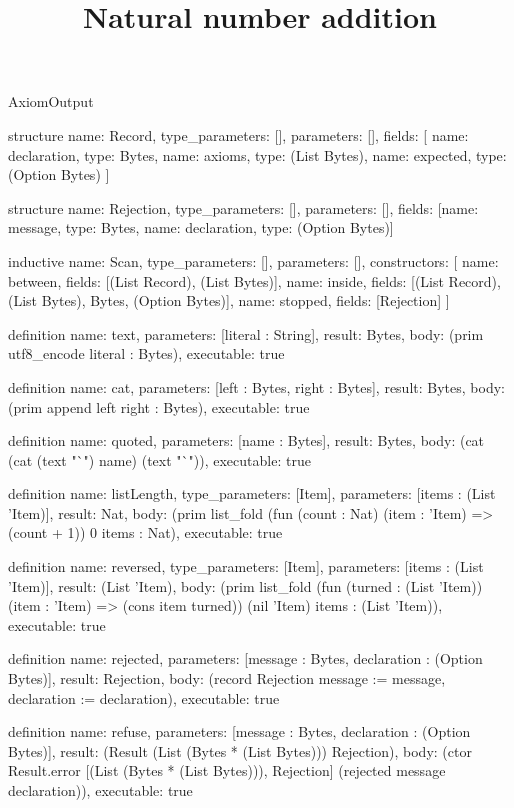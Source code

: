 \begin{lexlean}{AxiomOutput}
\title{Natural number addition}
\begin{semanticmodule}
structure{
  name: Record,
  type_parameters: [],
  parameters: [],
  fields: [
    {name: declaration, type: Bytes},
    {name: axioms, type: (List Bytes)},
    {name: expected, type: (Option Bytes)}
  ]
}

structure{
  name: Rejection,
  type_parameters: [],
  parameters: [],
  fields: [{name: message, type: Bytes}, {name: declaration, type: (Option Bytes)}]
}

inductive{
  name: Scan,
  type_parameters: [],
  parameters: [],
  constructors: [
    {name: between, fields: [(List Record), (List Bytes)]},
    {name: inside, fields: [(List Record), (List Bytes), Bytes, (Option Bytes)]},
    {name: stopped, fields: [Rejection]}
  ]
}

definition{
  name: text,
  parameters: [literal : String],
  result: Bytes,
  body: (prim utf8_encode literal : Bytes),
  executable: true
}

definition{
  name: cat,
  parameters: [left : Bytes, right : Bytes],
  result: Bytes,
  body: (prim append left right : Bytes),
  executable: true
}

definition{
  name: quoted,
  parameters: [name : Bytes],
  result: Bytes,
  body: (cat (cat (text "`") name) (text "`")),
  executable: true
}

definition{
  name: listLength,
  type_parameters: [Item],
  parameters: [items : (List 'Item)],
  result: Nat,
  body: (prim list_fold (fun (count : Nat) (item : 'Item) => (count + 1)) 0 items : Nat),
  executable: true
}

definition{
  name: reversed,
  type_parameters: [Item],
  parameters: [items : (List 'Item)],
  result: (List 'Item),
  body: (prim list_fold (fun (turned : (List 'Item)) (item : 'Item) => (cons item turned)) (nil 'Item) items : (List 'Item)),
  executable: true
}

definition{
  name: rejected,
  parameters: [message : Bytes, declaration : (Option Bytes)],
  result: Rejection,
  body: (record Rejection {message := message, declaration := declaration}),
  executable: true
}

definition{
  name: refuse,
  parameters: [message : Bytes, declaration : (Option Bytes)],
  result: (Result (List (Bytes * (List Bytes))) Rejection),
  body: (ctor Result.error [(List (Bytes * (List Bytes))), Rejection] (rejected message declaration)),
  executable: true
}


\end{semanticmodule}
\end{lexlean}
